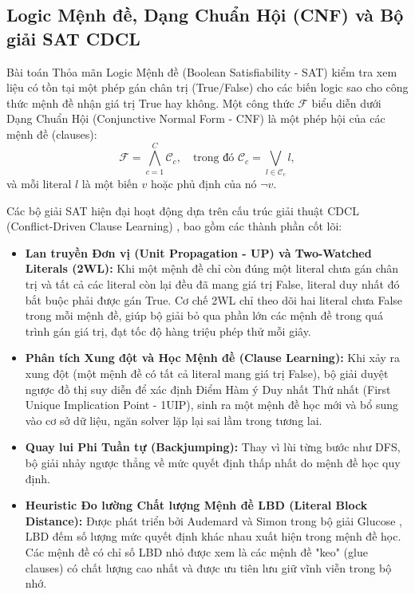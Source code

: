 \documentclass[a4paper,fleqn]{cas-sc}
\begin{document}
\subsection{Logic Mệnh đề, Dạng Chuẩn Hội (CNF) và Bộ giải SAT CDCL}
Bài toán Thỏa mãn Logic Mệnh đề (Boolean Satisfiability - SAT) kiểm tra xem liệu có tồn tại một phép gán chân trị (True/False) cho các biến logic sao cho công thức mệnh đề nhận giá trị True hay không. Một công thức $\mathcal{F}$ biểu diễn dưới Dạng Chuẩn Hội (Conjunctive Normal Form - CNF) là một phép hội của các mệnh đề (clauses):
\begin{equation}
    \mathcal{F} = \bigwedge_{c=1}^C \mathcal{C}_c, \quad \text{trong đó } \mathcal{C}_c = \bigvee_{l \in \mathcal{C}_c} l,
\end{equation}
và mỗi literal $l$ là một biến $v$ hoặc phủ định của nó $\neg v$.

Các bộ giải SAT hiện đại hoạt động dựa trên cấu trúc giải thuật CDCL (Conflict-Driven Clause Learning) \cite{biere2009handbook}, bao gồm các thành phần cốt lõi:
\begin{itemize}
    \item \textbf{Lan truyền Đơn vị (Unit Propagation - UP) và Two-Watched Literals (2WL):} Khi một mệnh đề chỉ còn đúng một literal chưa gán chân trị và tất cả các literal còn lại đều đã mang giá trị False, literal duy nhất đó bắt buộc phải được gán True. Cơ chế 2WL \cite{moskewicz2001chaff} chỉ theo dõi hai literal chưa False trong mỗi mệnh đề, giúp bộ giải bỏ qua phần lớn các mệnh đề trong quá trình gán giá trị, đạt tốc độ hàng triệu phép thử mỗi giây.
    \item \textbf{Phân tích Xung đột và Học Mệnh đề (Clause Learning):} Khi xảy ra xung đột (một mệnh đề có tất cả literal mang giá trị False), bộ giải duyệt ngược đồ thị suy diễn để xác định Điểm Hàm ý Duy nhất Thứ nhất (First Unique Implication Point - 1UIP), sinh ra một mệnh đề học mới và bổ sung vào cơ sở dữ liệu, ngăn solver lặp lại sai lầm trong tương lai.
    \item \textbf{Quay lui Phi Tuần tự (Backjumping):} Thay vì lùi từng bước như DFS, bộ giải nhảy ngược thẳng về mức quyết định thấp nhất do mệnh đề học quy định.
    \item \textbf{Heuristic Đo lường Chất lượng Mệnh đề LBD (Literal Block Distance):} Được phát triển bởi Audemard và Simon trong bộ giải Glucose \cite{audemard2009predicting}, LBD đếm số lượng mức quyết định khác nhau xuất hiện trong mệnh đề học. Các mệnh đề có chỉ số LBD nhỏ được xem là các mệnh đề "keo" (glue clauses) có chất lượng cao nhất và được ưu tiên lưu giữ vĩnh viễn trong bộ nhớ.
\end{itemize}
\end{document}

